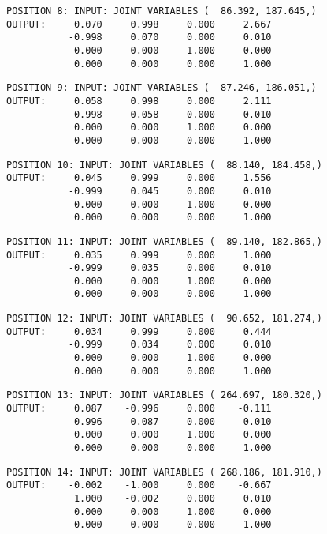\begin{verbatim}
\end{verbatim} \pagebreak[1]\begin{verbatim}
POSITION 8: INPUT: JOINT VARIABLES (  86.392, 187.645,)
OUTPUT:     0.070     0.998     0.000     2.667
           -0.998     0.070     0.000     0.010
            0.000     0.000     1.000     0.000
            0.000     0.000     0.000     1.000
\end{verbatim} \pagebreak[1]\begin{verbatim}
POSITION 9: INPUT: JOINT VARIABLES (  87.246, 186.051,)
OUTPUT:     0.058     0.998     0.000     2.111
           -0.998     0.058     0.000     0.010
            0.000     0.000     1.000     0.000
            0.000     0.000     0.000     1.000
\end{verbatim} \pagebreak[1]\begin{verbatim}
POSITION 10: INPUT: JOINT VARIABLES (  88.140, 184.458,)
OUTPUT:     0.045     0.999     0.000     1.556
           -0.999     0.045     0.000     0.010
            0.000     0.000     1.000     0.000
            0.000     0.000     0.000     1.000
\end{verbatim} \pagebreak[1]\begin{verbatim}
POSITION 11: INPUT: JOINT VARIABLES (  89.140, 182.865,)
OUTPUT:     0.035     0.999     0.000     1.000
           -0.999     0.035     0.000     0.010
            0.000     0.000     1.000     0.000
            0.000     0.000     0.000     1.000
\end{verbatim} \pagebreak[1]\begin{verbatim}
POSITION 12: INPUT: JOINT VARIABLES (  90.652, 181.274,)
OUTPUT:     0.034     0.999     0.000     0.444
           -0.999     0.034     0.000     0.010
            0.000     0.000     1.000     0.000
            0.000     0.000     0.000     1.000
\end{verbatim} \pagebreak[1]\begin{verbatim}
POSITION 13: INPUT: JOINT VARIABLES ( 264.697, 180.320,)
OUTPUT:     0.087    -0.996     0.000    -0.111
            0.996     0.087     0.000     0.010
            0.000     0.000     1.000     0.000
            0.000     0.000     0.000     1.000
\end{verbatim} \pagebreak[1]\begin{verbatim}
POSITION 14: INPUT: JOINT VARIABLES ( 268.186, 181.910,)
OUTPUT:    -0.002    -1.000     0.000    -0.667
            1.000    -0.002     0.000     0.010
            0.000     0.000     1.000     0.000
            0.000     0.000     0.000     1.000

\end{verbatim}
